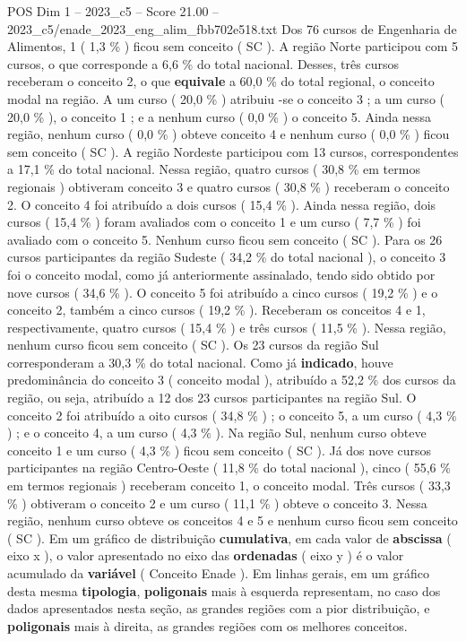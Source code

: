 \begin{textsample}{POS Dim 1 – 2023\_c5 – Score 21.00 – 2023\_c5/enade\_2023\_eng\_alim\_fbb702e518.txt}
Dos 76 cursos de Engenharia de Alimentos, 1 ( 1,3 \% ) ficou sem conceito ( SC ).
A região Norte participou com 5 cursos, o que corresponde a 6,6 \% do total nacional.
Desses, três cursos receberam o conceito 2, o que \textbf{equivale} a 60,0 \% do total regional, o conceito modal na região.
A um curso ( 20,0 \% ) atribuiu -se o conceito 3 ; a um curso ( 20,0 \% ), o conceito 1 ; e a nenhum curso ( 0,0 \% ) o conceito 5.
Ainda nessa região, nenhum curso ( 0,0 \% ) obteve conceito 4 e nenhum curso ( 0,0 \% ) ficou sem conceito ( SC ).
A região Nordeste participou com 13 cursos, correspondentes a 17,1 \% do total nacional.
Nessa região, quatro cursos ( 30,8 \% em termos regionais ) obtiveram conceito 3 e quatro cursos ( 30,8 \% ) receberam o conceito 2.
O conceito 4 foi atribuído a dois cursos ( 15,4 \% ).
Ainda nessa região, dois cursos ( 15,4 \% ) foram avaliados com o conceito 1 e um curso ( 7,7 \% ) foi avaliado com o conceito 5.
Nenhum curso ficou sem conceito ( SC ).
Para os 26 cursos participantes da região Sudeste ( 34,2 \% do total nacional ), o conceito 3 foi o conceito modal, como já anteriormente assinalado, tendo sido obtido por nove cursos ( 34,6 \% ).
O conceito 5 foi atribuído a cinco cursos ( 19,2 \% ) e o conceito 2, também a cinco cursos ( 19,2 \% ).
Receberam os conceitos 4 e 1, respectivamente, quatro cursos ( 15,4 \% ) e três cursos ( 11,5 \% ).
Nessa região, nenhum curso ficou sem conceito ( SC ).
Os 23 cursos da região Sul corresponderam a 30,3 \% do total nacional.
Como já \textbf{indicado}, houve predominância do conceito 3 ( conceito modal ), atribuído a 52,2 \% dos cursos da região, ou seja, atribuído a 12 dos 23 cursos participantes na região Sul.
O conceito 2 foi atribuído a oito cursos ( 34,8 \% ) ; o conceito 5, a um curso ( 4,3 \% ) ; e o conceito 4, a um curso ( 4,3 \% ).
Na região Sul, nenhum curso obteve conceito 1 e um curso ( 4,3 \% ) ficou sem conceito ( SC ).
Já dos nove cursos participantes na região Centro-Oeste ( 11,8 \% do total nacional ), cinco ( 55,6 \% em termos regionais ) receberam conceito 1, o conceito modal.
Três cursos ( 33,3 \% ) obtiveram o conceito 2 e um curso ( 11,1 \% ) obteve o conceito 3.
Nessa região, nenhum curso obteve os conceitos 4 e 5 e nenhum curso ficou sem conceito ( SC ).
Em um gráfico de distribuição \textbf{cumulativa}, em cada valor de \textbf{abscissa} ( eixo x ), o valor apresentado no eixo das \textbf{ordenadas} ( eixo y ) é o valor acumulado da \textbf{variável} ( Conceito Enade ).
Em linhas gerais, em um gráfico desta mesma \textbf{tipologia}, \textbf{poligonais} mais à esquerda representam, no caso dos dados apresentados nesta seção, as grandes regiões com a pior distribuição, e \textbf{poligonais} mais à direita, as grandes regiões com os melhores conceitos.

\end{textsample}
